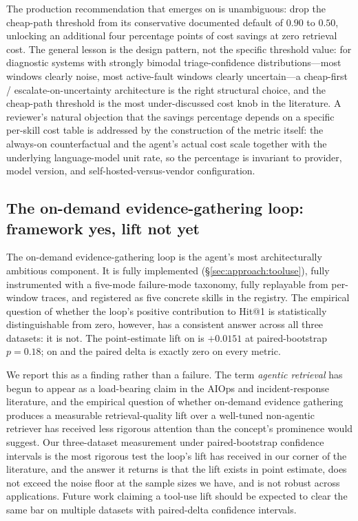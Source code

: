 The production recommendation that emerges on \dsob{} is unambiguous: drop the cheap-path threshold from its conservative documented default of $0.90$ to $0.50$, unlocking an additional four percentage points of cost savings at zero retrieval cost. The general lesson is the design pattern, not the specific threshold value: for diagnostic systems with strongly bimodal triage-confidence distributions---most windows clearly noise, most active-fault windows clearly uncertain---a cheap-first / escalate-on-uncertainty architecture is the right structural choice, and the cheap-path threshold is the most under-discussed cost knob in the literature. A reviewer's natural objection that the savings percentage depends on a specific per-skill cost table is addressed by the construction of the metric itself: the always-on counterfactual and the agent's actual cost scale together with the underlying language-model unit rate, so the percentage is invariant to provider, model version, and self-hosted-versus-vendor configuration.

\subsection{The on-demand evidence-gathering loop: framework yes, lift not yet}
\label{sec:discussion:react}

The on-demand evidence-gathering loop is the agent's most architecturally ambitious component. It is fully implemented (\S\ref{sec:approach:tooluse}), fully instrumented with a five-mode failure-mode taxonomy, fully replayable from per-window traces, and registered as five concrete skills in the registry. The empirical question of whether the loop's positive contribution to Hit@1 is statistically distinguishable from zero, however, has a consistent answer across all three datasets: it is not. The point-estimate lift on \dsob{} is $+0.0151$ at paired-bootstrap $p = 0.18$; on \dsotel{} and \dswol{} the paired delta is exactly zero on every metric.

We report this as a finding rather than a failure. The term \emph{agentic retrieval} has begun to appear as a load-bearing claim in the AIOps and incident-response literature, and the empirical question of whether on-demand evidence gathering produces a measurable retrieval-quality lift over a well-tuned non-agentic retriever has received less rigorous attention than the concept's prominence would suggest. Our three-dataset measurement under paired-bootstrap confidence intervals is the most rigorous test the loop's lift has received in our corner of the literature, and the answer it returns is that the lift exists in point estimate, does not exceed the noise floor at the sample sizes we have, and is not robust across applications. Future work claiming a tool-use lift should be expected to clear the same bar on multiple datasets with paired-delta confidence intervals.

